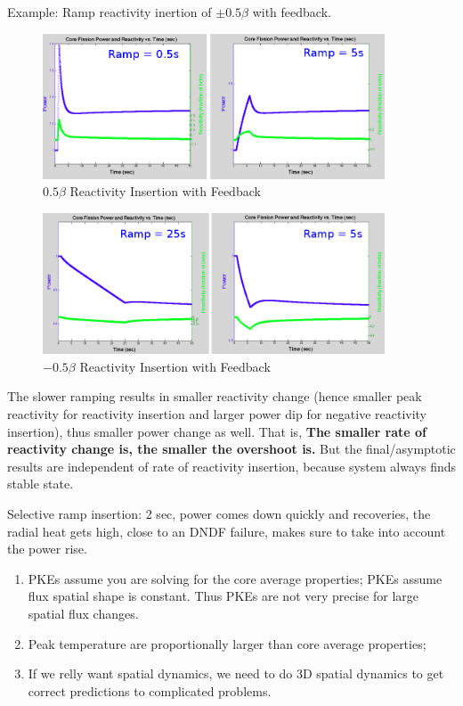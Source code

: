 \documentclass{school-22.211-notes}
\begin{document}
Example: Ramp reactivity inertion of $\pm 0.5\beta$ with feedback. 
\begin{figure}[ht]
  \centering
  \includegraphics[width=4in]{images/pke/fn5.png}
  \caption{$0.5 \beta$ Reactivity Insertion with Feedback}
\end{figure}
\begin{figure}[ht]
  \centering
  \includegraphics[width=4in]{images/pke/fn6.png}
  \caption{$-0.5 \beta$ Reactivity Insertion with Feedback}
\end{figure}
The slower ramping results in smaller reactivity change (hence smaller peak reactivity for reactivity insertion and larger power dip for negative reactivity insertion), thus smaller power change as well. That is, \textbf{The smaller rate of reactivity change is, the smaller the overshoot is.} But the final/asymptotic results are independent of rate of reactivity insertion, because system always finds stable state. 

Selective ramp insertion: 2 sec, power comes down quickly and recoveries, the radial heat gets high, close to an DNDF failure, makes sure to take into account the power rise. 

 

\begin{enumerate}
\item PKEs assume you are solving for the core average properties; PKEs assume flux spatial shape is constant. Thus PKEs are not very precise for large spatial flux changes. 
\item Peak temperature are proportionally larger than core average properties;
\item If we relly want spatial dynamics, we need to do 3D spatial dynamics to get correct predictions to complicated problems. 
\end{enumerate}
\end{document}
